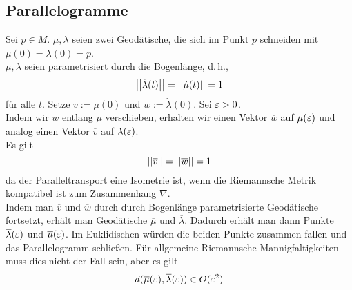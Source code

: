 \subsection{Parallelogramme}
Sei $p\in M$. $\mu, \lambda$ seien zwei Geodätische, die sich im Punkt $p$ schneiden mit $\mu(0) = \lambda(0) = p$.\\
$\mu, \lambda$ seien parametrisiert durch die Bogenlänge, d.\,h.,
\[ \left|\left|\dot{\lambda}(t)\right|\right| = \left|\left|\dot{\mu}(t)\right|\right| = 1 \]
für alle $t$. Setze $v := \dot{\mu}(0)$ und $w := \dot{\lambda}(0)$. Sei $\varepsilon > 0$.\\
Indem wir $w$ entlang $\mu$ verschieben, erhalten wir einen Vektor $\overline{w}$ auf $\mu(\varepsilon)$ und analog einen Vektor $\overline{v}$ auf $\lambda(\varepsilon)$.\\
Es gilt
\[ \left|\left|\overline{v}\right|\right| = \left|\left|\overline{w}\right|\right| = 1 \]
da der Paralleltransport eine Isometrie ist, wenn die Riemannsche Metrik kompatibel ist zum Zusammenhang $\nabla$.\\
Indem man $\overline{v}$ und $\overline{w}$ durch durch Bogenlänge parametrisierte Geodätische fortsetzt, erhält man Geodätische $\overline{\mu}$ und $\overline{\lambda}$. Dadurch erhält man dann Punkte $\overline{\lambda}(\varepsilon) $ und $\overline{\mu}(\varepsilon)$. Im Euklidischen würden die beiden Punkte zusammen fallen und das Parallelogramm schließen. Für allgemeine Riemannsche Mannigfaltigkeiten muss dies nicht der Fall sein, aber es gilt
\[ d(\overline{\mu}(\varepsilon), \overline{\lambda}(\varepsilon)) \in O(\varepsilon^2) \]